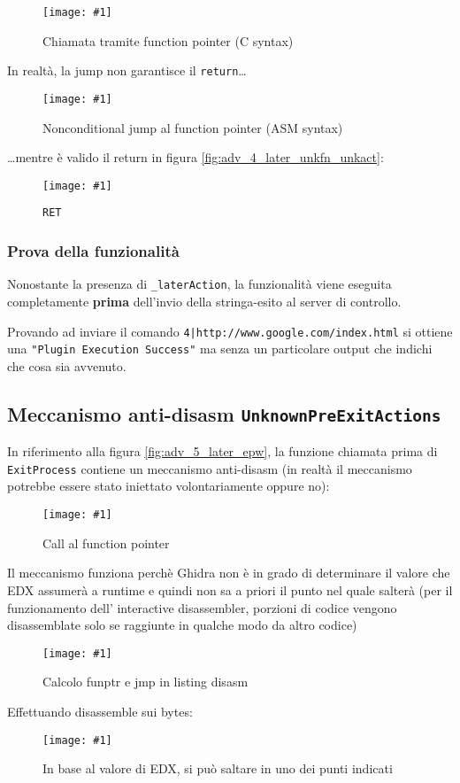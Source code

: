 \documentclass[
    a4paper, %
    11pt %
]{article}
\newcommand{\pic}[4]{\begin{figure}[H]
            \centering
            \texttt{[image: \#1]}
            \caption{#2}
            \label{fig:#1}
            \end{figure}}
\begin{document}
            \pic{adv_4_later_unkfn_fptr_call}{Chiamata tramite function pointer (C syntax)}{17cm}{2.5cm}

            In realtà, la jump non garantisce il \texttt{return}\dots
            \pic{adv_4_later_unkfn_fptr_call_asm}{Nonconditional jump al function pointer (ASM syntax)}{17cm}{2.5cm}

            \dots mentre è valido il return in figura \ref{fig:adv_4_later_unkfn_unkact}:
            \pic{adv_4_later_unkfn_ret_asm}{\texttt{RET}}{15.5cm}{3cm}

            \subsubsection{Prova della funzionalità}

            Nonostante la presenza di \texttt{\_laterAction}, la funzionalità viene eseguita completamente \textbf{prima} dell'invio della stringa-esito al server di controllo.

            Provando ad inviare il comando \texttt{4|http://www.google.com/index.html} si ottiene una
            \texttt{"Plugin Execution Success"} ma senza un particolare output che indichi che cosa sia avvenuto.

            \subsection{Meccanismo anti-disasm \texttt{UnknownPreExitActions}}\label{sect:antidisasm}
            In riferimento alla figura \ref{fig:adv_5_later_epw}, la funzione chiamata prima di
            \texttt{ExitProcess} contiene un meccanismo anti-disasm (in realtà il meccanismo potrebbe essere
            stato iniettato volontariamente oppure no):
            
            \pic{unkpreexitact_decomp}{Call al function pointer}{15cm}{6cm}

            Il meccanismo funziona perchè Ghidra non è in grado di determinare il valore che EDX assumerà
            a runtime e quindi non sa a priori il punto nel quale salterà (per il funzionamento dell' 
            interactive disassembler, porzioni di codice vengono disassemblate solo se raggiunte in qualche modo da 
            altro codice)
            \pic{unkpreexitact}{Calcolo funptr e jmp in listing disasm}{15cm}{5cm}

            Effettuando disassemble sui bytes:

            \pic{unkpreexitact_jmptable}{In base al valore di EDX, si può saltare in uno dei punti indicati}
            {16cm}{15cm}
\end{document}
